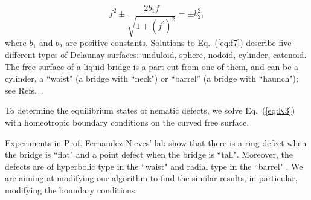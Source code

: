 \documentclass[nottitlepage]{article}
\begin{document}
\begin{equation}\label{eq:f7}
f^2\pm \frac{2b_1f}{\sqrt{1+(f^{'})^2}}=\pm b_2^2,
\end{equation}
 where $b_1$ and $b_2$ are positive constants. Solutions to Eq.~(\ref{eq:f7}) describe five different types of Delaunay surfaces: unduloid, sphere, nodoid, cylinder, catenoid. The free surface of a liquid bridge is a part cut from one of them, and can be a cylinder, a ``waist" (a bridge with ``neck") or ``barrel'' (a bridge with ``haunch"); see Refs.~\cite{lopez, lubarda, kra}.

 To determine the equilibrium states of nematic defects, we %
solve Eq.~(\ref{eq:K3}) with homeotropic boundary conditions on the curved free surface. %

 Experiments in Prof. Fernandez-Nieves' lab show that there is a ring defect when the bridge is ``flat" and a point defect when the bridge is ``tall". Moreover, the defects are of hyperbolic type in the ``waist" and radial type in the ``barrel" \cite{perry}. We are aiming at modifying our algorithm to find the similar results, in particular, modifying the boundary conditions.

 
 
 
\end{document}

